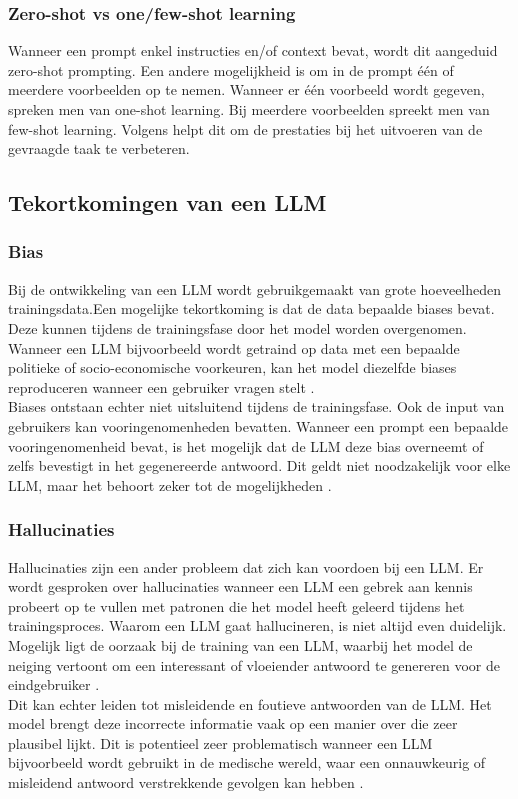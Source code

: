 \subsubsection{Zero-shot vs one/few-shot learning}

Wanneer een prompt enkel instructies en/of context bevat, wordt dit aangeduid zero-shot prompting. Een andere mogelijkheid is om in de prompt één of meerdere voorbeelden op te nemen. Wanneer er één voorbeeld wordt gegeven, spreken men van one-shot learning. Bij meerdere voorbeelden spreekt men van few-shot learning. Volgens \textcite{Marvin2024} helpt dit om de prestaties bij het uitvoeren van de gevraagde taak te verbeteren.

\subsection{Tekortkomingen van een LLM}

\subsubsection{Bias}
Bij de ontwikkeling van een LLM wordt gebruikgemaakt van grote hoeveelheden trainingsdata.Een mogelijke tekortkoming is dat de data bepaalde biases bevat. Deze kunnen tijdens de trainingsfase door het model worden overgenomen. Wanneer een LLM bijvoorbeeld wordt getraind op data met een bepaalde politieke of socio-economische voorkeuren, kan het model diezelfde biases reproduceren wanneer een gebruiker vragen stelt \autocite{Hadi2023}.
\\[1em]
Biases ontstaan echter niet uitsluitend tijdens de trainingsfase. Ook de input van gebruikers kan vooringenomenheden bevatten. Wanneer een prompt een bepaalde vooringenomenheid bevat, is het mogelijk dat de LLM deze bias overneemt of zelfs bevestigt in het gegenereerde antwoord. Dit geldt niet noodzakelijk voor elke LLM, maar het behoort zeker tot de mogelijkheden \autocite{Hadi2023}.

\subsubsection{Hallucinaties}
Hallucinaties zijn een ander probleem dat zich kan voordoen bij een LLM. Er wordt gesproken over hallucinaties wanneer een LLM een gebrek aan kennis probeert op te vullen met patronen die het model heeft geleerd tijdens het trainingsproces. Waarom een LLM gaat hallucineren, is niet altijd even duidelijk. Mogelijk ligt de oorzaak bij de training van een LLM, waarbij het model de neiging vertoont om een interessant of vloeiender antwoord te genereren voor de eindgebruiker \autocite{Hadi2023}.
\\[1em]
Dit kan echter leiden tot misleidende en foutieve antwoorden van de LLM. Het model brengt deze incorrecte informatie vaak op een manier over die zeer plausibel lijkt. Dit is potentieel zeer problematisch wanneer een LLM bijvoorbeeld wordt gebruikt in de medische wereld, waar een onnauwkeurig of misleidend antwoord verstrekkende gevolgen kan hebben \autocite{Ji2023}.

